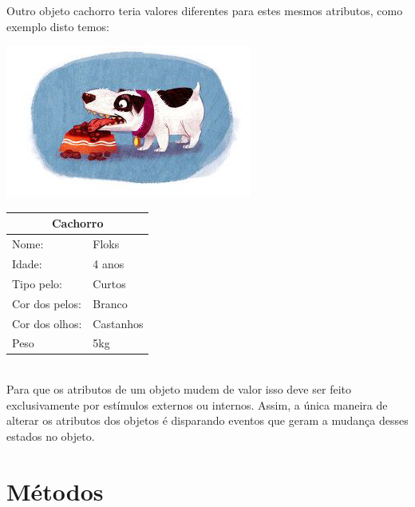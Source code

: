   Outro objeto cachorro teria valores diferentes para estes mesmos 
  atributos, como exemplo disto temos:

  \begin{minipage}{\textwidth}
    \begin{minipage}[b]{0.49\textwidth}
      \centering
      \includegraphics[scale=0.6]{imagens/cachorro-objeto-2.png}
      \label{fig:cachorro-objeto-2}
    \end{minipage}
    \hfill
    \begin{minipage}[b]{0.49\textwidth}
      \centering
      \begin{tabular}{|l|l|}
        \hline
        \multicolumn{2}{|c|}{Cachorro}      \\ \hline
          Nome:                 & Floks     \\ \hline
          Idade:                & 4 anos    \\ \hline
          Tipo pelo:            & Curtos    \\ \hline
          Cor dos pelos:        & Branco    \\ \hline
          Cor dos olhos:        & Castanhos \\ \hline
          Peso                  & 5kg       \\ \hline
        \end{tabular}
      \end{minipage}
    \end{minipage} \\ 

    Para que os atributos de um objeto mudem de valor isso deve ser feito 
    exclusivamente por estímulos externos ou internos. Assim, a única maneira 
    de alterar os atributos dos objetos é disparando eventos que geram a 
    mudança desses estados no objeto.

\section{Métodos}

